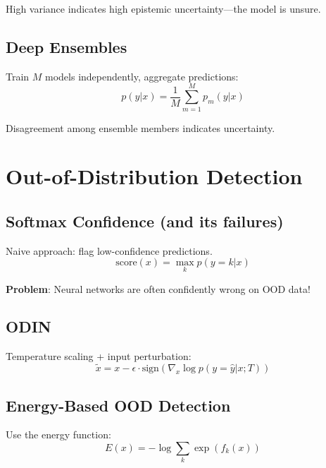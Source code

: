 High variance indicates high epistemic uncertainty---the model is unsure.

\subsection{Deep Ensembles}

Train $M$ models independently, aggregate predictions:
\begin{equation}
    p(y|x) = \frac{1}{M} \sum_{m=1}^M p_m(y|x)
\end{equation}

Disagreement among ensemble members indicates uncertainty.


\section{Out-of-Distribution Detection}


\subsection{Softmax Confidence (and its failures)}

Naive approach: flag low-confidence predictions.
\begin{equation}
    \text{score}(x) = \max_k p(y=k|x)
\end{equation}

\textbf{Problem}: Neural networks are often confidently wrong on OOD data!

\subsection{ODIN}

Temperature scaling + input perturbation:
\begin{equation}
    \tilde{x} = x - \epsilon \cdot \text{sign}(\nabla_x \log p(y=\hat{y}|x; T))
\end{equation}

\subsection{Energy-Based OOD Detection}

Use the energy function:
\begin{equation}
    E(x) = -\log \sum_k \exp(f_k(x))
\end{equation}

